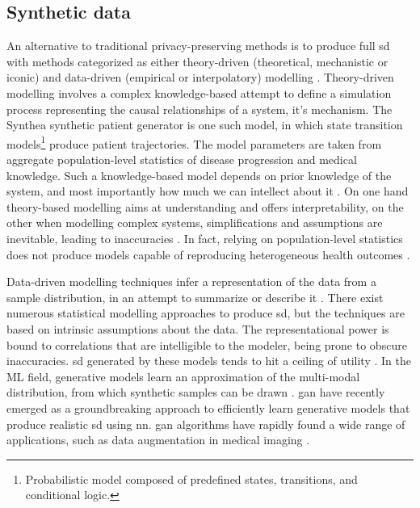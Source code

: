     \subsection{Synthetic data}
        An alternative to traditional privacy-preserving methods is to produce full \gls{sd} with methods categorized as either theory-driven (theoretical, mechanistic or iconic) and data-driven (empirical or interpolatory) modelling \cite{Kim_2017, Hand2019}. Theory-driven modelling involves a complex knowledge-based attempt to define a simulation process representing the causal relationships of a system, it's mechanism. The Synthea \cite{Walonoski_2017} synthetic patient generator is one such model, in which state transition models\footnote{Probabilistic model composed of predefined states, transitions, and conditional logic.} produce patient trajectories. The model parameters are taken from aggregate population-level statistics of disease progression and medical knowledge. Such a knowledge-based model depends on prior knowledge of the system, and most importantly how much we can intellect about it \cite{Kim_2017}. On one hand theory-based modelling aims at understanding and offers interpretability, on the other when modelling complex systems, simplifications and assumptions are inevitable, leading to inaccuracies \cite{Hand2019}. In fact, relying on population-level statistics does not produce models capable of reproducing heterogeneous health outcomes \cite{Chen_2019}.\par
        
        Data-driven modelling techniques infer a representation of the data from a sample distribution, in an attempt to summarize or describe it \cite{Hand2019}. There exist numerous statistical modelling approaches to produce \gls{sd}, but the techniques are based on intrinsic assumptions about the data. The representational power is bound to correlations that are intelligible to the modeler, being prone to obscure inaccuracies. \gls{sd} generated by these models tends to hit a ceiling of utility \cite{Rankin2020}. In the ML field, generative models learn an approximation of the multi-modal distribution, from which synthetic samples can be drawn \cite{goodfellow2016nips}. \Gls{gan} \cite{NIPS2014_5423} have recently emerged as a groundbreaking approach to efficiently learn generative models that produce realistic \gls{sd} using \gls{nn}. \gls{gan} algorithms have rapidly found a wide range of applications, such as data augmentation in medical imaging \cite{Yi2019, Wang2020, Zhou2020}.\par
        
